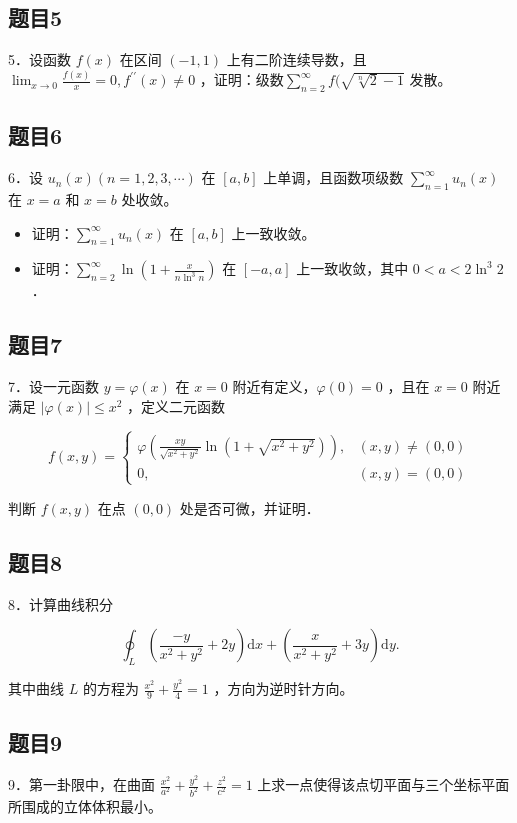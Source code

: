 \documentclass{article}
\begin{document}
\subsection{题目5}
5．设函数 \(f(x)\) 在区间 \((-1,1)\) 上有二阶连续导数，且 \(\lim _{x \rightarrow 0} \frac{f(x)}{x}=0, f^{\prime \prime}(x) \neq 0\) ，证明：级数\(\sum_{n=2}^{\infty} f(\sqrt{\sqrt[n]{2}-1}\) 发散。

\subsection{题目6}
6．设 \(u_{n}(x)(n=1,2,3, \cdots)\) 在 \([a, b]\) 上单调，且函数项级数 \(\sum_{n=1}^{\infty} u_{n}(x)\) 在 \(x=a\) 和 \(x=b\) 处收敛。

\begin{itemize}
  \item[（1）] 证明：\(\sum_{n=1}^{\infty} u_{n}(x)\) 在 \([a, b]\) 上一致收敛。
  \item[（2）] 证明：\(\sum_{n=2}^{\infty} \ln \left(1+\frac{x}{n \ln ^{3} n}\right)\) 在 \([-a, a]\) 上一致收敛，其中 \(0<a<2 \ln ^{3} 2\) ．
\end{itemize}

\subsection{题目7}
7．设一元函数 \(y=\varphi(x)\) 在 \(x=0\) 附近有定义，\(\varphi(0)=0\) ，且在 \(x=0\) 附近满足 \(|\varphi(x)| \leq x^{2}\) ，定义二元函数

\[
f(x, y)= \begin{cases}\varphi\left(\frac{x y}{\sqrt{x^{2}+y^{2}}} \ln \left(1+\sqrt{x^{2}+y^{2}}\right)\right), & (x, y) \neq(0,0) \\ 0, & (x, y)=(0,0)\end{cases}
\]

判断 \(f(x, y)\) 在点 \((0,0)\) 处是否可微，并证明．

\subsection{题目8}
8．计算曲线积分

\[
\oint_{L}\left(\frac{-y}{x^{2}+y^{2}}+2 y\right) \mathrm{d} x+\left(\frac{x}{x^{2}+y^{2}}+3 y\right) \mathrm{d} y .
\]

其中曲线 \(L\) 的方程为 \(\frac{x^{2}}{9}+\frac{y^{2}}{4}=1\) ，方向为逆时针方向。

\subsection{题目9}
9．第一卦限中，在曲面 \(\frac{x^{2}}{a^{2}}+\frac{y^{2}}{b^{2}}+\frac{z^{2}}{c^{2}}=1\) 上求一点使得该点切平面与三个坐标平面所围成的立体体积最小。
\end{document}
